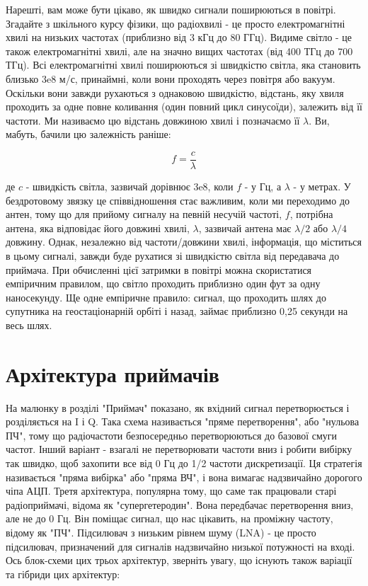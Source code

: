 Нарешті, вам може бути цікаво, як швидко сигнали поширюються в повітрі.
Згадайте з шкільного курсу фізики, що радіохвилі - це просто
електромагнітні хвилі на низьких частотах (приблизно від 3 кГц до 80
ГГц). Видиме світло - це також електромагнітні хвилі, але на значно
вищих частотах (від 400 ТГц до 700 ТГц). Всі електромагнітні хвилі
поширюються зі швидкістю світла, яка становить близько 3e8 м/с,
принаймні, коли вони проходять через повітря або вакуум. Оскільки вони
завжди рухаються з однаковою швидкістю, відстань, яку хвиля проходить за
одне повне коливання (один повний цикл синусоїди), залежить від її
частоти. Ми називаємо цю відстань довжиною хвилі і позначаємо її
\(\lambda\). Ви, мабуть, бачили цю залежність раніше:

\[f = \frac{c}{\lambda}\]

де \(c\) - швидкість світла, зазвичай дорівнює 3e8, коли \(f\) - у Гц, а
\(\lambda\) - у метрах. У бездротовому зв\textquotesingle язку це
співвідношення стає важливим, коли ми переходимо до антен, тому що для
прийому сигналу на певній несучій частоті, \(f\), потрібна антена, яка
відповідає його довжині хвилі, \(\lambda\), зазвичай антена має
\(\lambda/2\) або \(\lambda/4\) довжину. Однак, незалежно від
частоти/довжини хвилі, інформація, що міститься в цьому сигналі, завжди
буде рухатися зі швидкістю світла від передавача до приймача. При
обчисленні цієї затримки в повітрі можна скористатися емпіричним
правилом, що світло проходить приблизно один фут за одну наносекунду. Ще
одне емпіричне правило: сигнал, що проходить шлях до супутника на
геостаціонарній орбіті і назад, займає приблизно 0,25 секунди на весь
шлях.

\section{Архітектура
приймачів}\label{ux430ux440ux445ux456ux442ux435ux43aux442ux443ux440ux430-ux43fux440ux438ux439ux43cux430ux447ux456ux432}

На малюнку в розділі "Приймач" показано, як вхідний сигнал
перетворюється і розділяється на I і Q. Така схема називається "пряме
перетворення", або "нульова ПЧ", тому що радіочастоти безпосередньо
перетворюються до базової смуги частот. Інший варіант - взагалі не
перетворювати частоти вниз і робити вибірку так швидко, щоб захопити все
від 0 Гц до 1/2 частоти дискретизації. Ця стратегія називається "пряма
вибірка" або "пряма ВЧ", і вона вимагає надзвичайно дорогого чіпа АЦП.
Третя архітектура, популярна тому, що саме так працювали старі
радіоприймачі, відома як "супергетеродин". Вона передбачає перетворення
вниз, але не до 0 Гц. Він поміщає сигнал, що нас цікавить, на проміжну
частоту, відому як "ПЧ". Підсилювач з низьким рівнем шуму (LNA) - це
просто підсилювач, призначений для сигналів надзвичайно низької
потужності на вході. Ось блок-схеми цих трьох архітектур, зверніть
увагу, що існують також варіації та гібриди цих архітектур:

